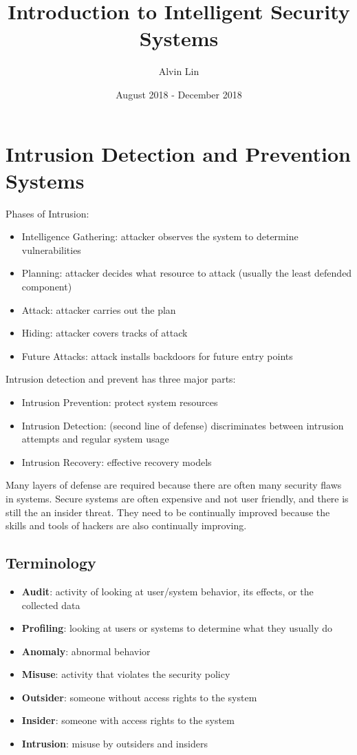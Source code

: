 \documentclass{math}
\title{Introduction to Intelligent Security Systems}
\author{Alvin Lin}
\date{August 2018 - December 2018}
\begin{document}
\maketitle

\section*{Intrusion Detection and Prevention Systems}
Phases of Intrusion:
\begin{itemize}
  \item Intelligence Gathering: attacker observes the system to determine
    vulnerabilities
  \item Planning: attacker decides what resource to attack (usually the
    least defended component)
  \item Attack: attacker carries out the plan
  \item Hiding: attacker covers tracks of attack
  \item Future Attacks: attack installs backdoors for future entry points
\end{itemize}
Intrusion detection and prevent has three major parts:
\begin{itemize}
  \item Intrusion Prevention: protect system resources
  \item Intrusion Detection: (second line of defense) discriminates between
    intrusion attempts and regular system usage
  \item Intrusion Recovery: effective recovery models
\end{itemize}
Many layers of defense are required because there are often many security flaws
in systems. Secure systems are often expensive and not user friendly, and there
is still the an insider threat. They need to be continually improved because
the skills and tools of hackers are also continually improving.

\subsection*{Terminology}
\begin{itemize}
  \item \textbf{Audit}: activity of looking at user/system behavior, its
    effects, or the collected data
  \item \textbf{Profiling}: looking at users or systems to determine what they usually do
  \item \textbf{Anomaly}: abnormal behavior
  \item \textbf{Misuse}: activity that violates the security policy
  \item \textbf{Outsider}: someone without access rights to the system
  \item \textbf{Insider}: someone with access rights to the system
  \item \textbf{Intrusion}: misuse by outsiders and insiders
\end{itemize}
\end{document}
